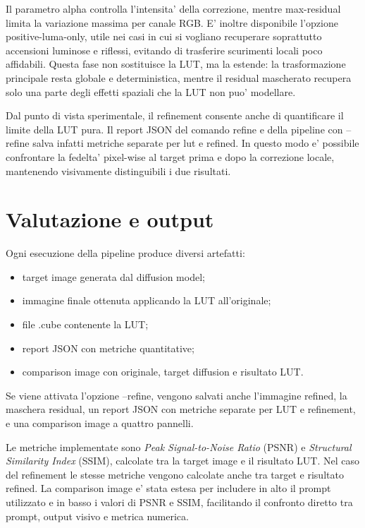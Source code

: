 \documentclass[12pt,a4paper]{report}
\renewcommand{\texttt}[1]{{\normalfont #1}}
\begin{document}
Il parametro \texttt{alpha} controlla l'intensita' della correzione, mentre \texttt{max-residual} limita la variazione massima per canale RGB. E' inoltre disponibile l'opzione \texttt{positive-luma-only}, utile nei casi in cui si vogliano recuperare soprattutto accensioni luminose e riflessi, evitando di trasferire scurimenti locali poco affidabili. Questa fase non sostituisce la LUT, ma la estende: la trasformazione principale resta globale e deterministica, mentre il residual mascherato recupera solo una parte degli effetti spaziali che la LUT non puo' modellare.

Dal punto di vista sperimentale, il refinement consente anche di quantificare il limite della LUT pura. Il report JSON del comando \texttt{refine} e della pipeline con \texttt{--refine} salva infatti metriche separate per \texttt{lut} e \texttt{refined}. In questo modo e' possibile confrontare la fedelta' pixel-wise al target prima e dopo la correzione locale, mantenendo visivamente distinguibili i due risultati.

\section{Valutazione e output}

Ogni esecuzione della pipeline produce diversi artefatti:

\begin{itemize}
    \item target image generata dal diffusion model;
    \item immagine finale ottenuta applicando la LUT all'originale;
    \item file \texttt{.cube} contenente la LUT;
    \item report JSON con metriche quantitative;
    \item comparison image con originale, target diffusion e risultato LUT.
\end{itemize}

Se viene attivata l'opzione \texttt{--refine}, vengono salvati anche l'immagine refined, la maschera residual, un report JSON con metriche separate per LUT e refinement, e una comparison image a quattro pannelli.

Le metriche implementate sono \textit{Peak Signal-to-Noise Ratio} (PSNR) e \textit{Structural Similarity Index} (SSIM), calcolate tra la target image e il risultato LUT. Nel caso del refinement le stesse metriche vengono calcolate anche tra target e risultato refined. La comparison image e' stata estesa per includere in alto il prompt utilizzato e in basso i valori di PSNR e SSIM, facilitando il confronto diretto tra prompt, output visivo e metrica numerica.
\end{document}
